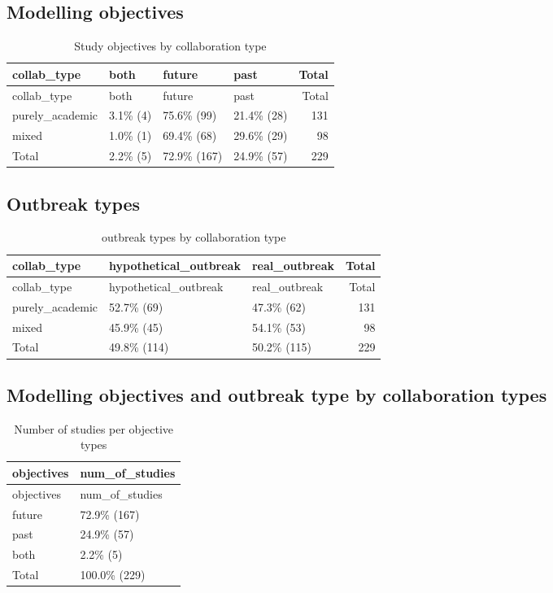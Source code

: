 \documentclass[
]{article}
\begin{document}
\hypertarget{modelling-objectives}{%
\subsection{Modelling objectives}\label{modelling-objectives}}

\begin{longtable}[]{@{}llllr@{}}
\caption{Study objectives by collaboration type}\tabularnewline
\toprule
collab\_type & both & future & past & Total \\
\midrule
\endfirsthead
\toprule
collab\_type & both & future & past & Total \\
\midrule
\endhead
purely\_academic & 3.1\% (4) & 75.6\% (99) & 21.4\% (28) & 131 \\
mixed & 1.0\% (1) & 69.4\% (68) & 29.6\% (29) & 98 \\
Total & 2.2\% (5) & 72.9\% (167) & 24.9\% (57) & 229 \\
\bottomrule
\end{longtable}

\hypertarget{outbreak-types}{%
\subsection{Outbreak types}\label{outbreak-types}}

\begin{longtable}[]{@{}lllr@{}}
\caption{outbreak types by collaboration type}\tabularnewline
\toprule
collab\_type & hypothetical\_outbreak & real\_outbreak & Total \\
\midrule
\endfirsthead
\toprule
collab\_type & hypothetical\_outbreak & real\_outbreak & Total \\
\midrule
\endhead
purely\_academic & 52.7\% (69) & 47.3\% (62) & 131 \\
mixed & 45.9\% (45) & 54.1\% (53) & 98 \\
Total & 49.8\% (114) & 50.2\% (115) & 229 \\
\bottomrule
\end{longtable}

\hypertarget{modelling-objectives-and-outbreak-type-by-collaboration-types}{%
\subsection{Modelling objectives and outbreak type by collaboration
types}\label{modelling-objectives-and-outbreak-type-by-collaboration-types}}

\begin{longtable}[]{@{}ll@{}}
\caption{Number of studies per objective types}\tabularnewline
\toprule
objectives & num\_of\_studies \\
\midrule
\endfirsthead
\toprule
objectives & num\_of\_studies \\
\midrule
\endhead
future & 72.9\% (167) \\
past & 24.9\% (57) \\
both & 2.2\% (5) \\
Total & 100.0\% (229) \\
\bottomrule
\end{longtable}
\end{document}
